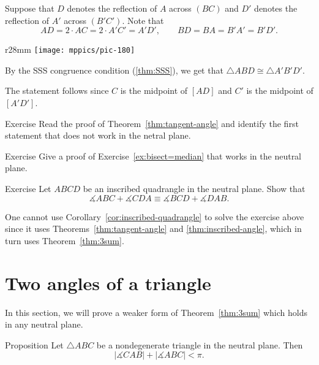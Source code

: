 Suppose that $D$ denotes the reflection of $A$ across $(BC)$
and $D'$ denotes the reflection of $A'$ across $(B'C')$.
Note that 
$$
AD=2\cdot AC=2\cdot A'C'=A'D',\qquad
BD=BA=B'A'=B'D'.
$$

{

\begin{wrapfigure}{r}{28mm}
\vskip-0mm
\centering
\texttt{[image: mppics/pic-180]}
\end{wrapfigure}

By the SSS congruence condition (\ref{thm:SSS}), 
we get that $\triangle ABD\cong \triangle A'B'D'$.

The statement follows since $C$ is the midpoint of $[AD]$
and $C'$ is the midpoint of $[A'D']$.  
\qeds

\begin{thm}{Exercise}\label{ex:tangent-angle-neutral}
Read the proof of Theorem~\ref{thm:tangent-angle} and identify the first statement that does not work in the netral plane.
\end{thm}

}


\begin{thm}{Exercise}\label{ex:abs-bisect=median}
Give a proof of Exercise~\ref{ex:bisect=median}
that works in the neutral plane. 
\end{thm}



\begin{thm}{Exercise}\label{ex:abs-inscibed}
Let $ABCD$ be an inscribed quadrangle in the neutral plane.
Show that
$$\measuredangle ABC+\measuredangle CDA\equiv \measuredangle BCD+\measuredangle DAB.$$

\end{thm}

One cannot use Corollary~\ref{cor:inscribed-quadrangle} to solve the exercise above since it uses Theorems~\ref{thm:tangent-angle} and \ref{thm:inscribed-angle},
which in turn uses Theorem~\ref{thm:3sum}.


\section{Two angles of a triangle}

In this section, we will prove a weaker form of Theorem~\ref{thm:3sum}
which holds in any neutral plane.

\begin{thm}{Proposition}\label{prop:2sum}
Let $\triangle ABC$ be a nondegenerate triangle in the neutral plane.
Then 
$$|\measuredangle CAB|+|\measuredangle ABC|< \pi.$$

\end{thm}

